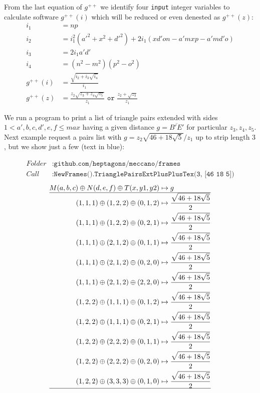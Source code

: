 \documentclass[11pt]{article}
\newenvironment{MyColorPar}[1]{
    \leavevmode\color{#1}\ignorespaces
}{
}
\begin{document}
From the last equation of $g^{++}$ we identify four \texttt{input} integer variables to calculate software $g^{++}(i)$ which will be reduced or even denested as $g^{++}(z)$:
\begin{align}
i_1 &= np \\
i_2 &= i_1^2(a'^2 + x^2 + d'^2) + 2i_1(xd'on - a'mxp - a'md'o)\\
i_3 &= 2i_1a'd' \nonumber\\
i_4 &= (n^2 - m^2)(p^2 - o^2)\\
g^{++}(i) &= \frac{\sqrt{i_2 + i_3\sqrt{i_4}}}{i_1}\\
g^{++}(z) &= \frac{z_2\sqrt{z_3 + z_4\sqrt{z_5}}}{z_1}
 \texttt{ or } \frac{z_2 + \sqrt{z_3}}{z_1}
\end{align}

We run a program to print a list of triangle pairs extended with sides $1 < a',b,c,d',e,f \leq max$ having a given distance $g = \overline{B'E'}$ for particular $z_3,z_4,z_5$. Next example request a pairs list with $g=z_2\sqrt{46+18\sqrt{5}}/z_1$ up to strip length $3$, but we show just a few (text in blue):

\begin{MyColorPar}{blue}
\begin{align*}
Folder &: \texttt{github.com/heptagons/meccano/frames}\\
Call &: \texttt{NewFrames().TrianglePairsExtPlusPlusTex(3, [46 18 5])}\end{align*}
\begin{align*}
M(a,b,c) \oplus N(d,e,f) \oplus T(x,y1,y2) &\mapsto g\\
\hline
(1,1,1) \oplus (1,2,2) \oplus (0,1,2) &\mapsto \frac{\sqrt{46+18\sqrt{5}}}{2} \\
(1,1,1) \oplus (1,2,2) \oplus (0,2,1) &\mapsto \frac{\sqrt{46+18\sqrt{5}}}{2} \\
(1,1,1) \oplus (2,1,2) \oplus (0,1,1) &\mapsto \frac{\sqrt{46+18\sqrt{5}}}{2} \\
(1,1,1) \oplus (2,1,2) \oplus (0,2,0) &\mapsto \frac{\sqrt{46+18\sqrt{5}}}{2} \\
(1,1,1) \oplus (2,1,2) \oplus (2,2,0) &\mapsto \frac{\sqrt{46+18\sqrt{5}}}{2} \\
(1,2,2) \oplus (1,1,1) \oplus (0,1,2) &\mapsto \frac{\sqrt{46+18\sqrt{5}}}{2} \\
(1,2,2) \oplus (1,1,1) \oplus (0,2,1) &\mapsto \frac{\sqrt{46+18\sqrt{5}}}{2} \\
(1,2,2) \oplus (2,2,2) \oplus (0,1,1) &\mapsto \frac{\sqrt{46+18\sqrt{5}}}{2} \\
(1,2,2) \oplus (2,2,2) \oplus (0,2,0) &\mapsto \frac{\sqrt{46+18\sqrt{5}}}{2} \\
(1,2,2) \oplus (3,3,3) \oplus (0,1,0) &\mapsto \frac{\sqrt{46+18\sqrt{5}}}{2} \\
\hline
\end{align*}
\end{MyColorPar}
\end{document}
